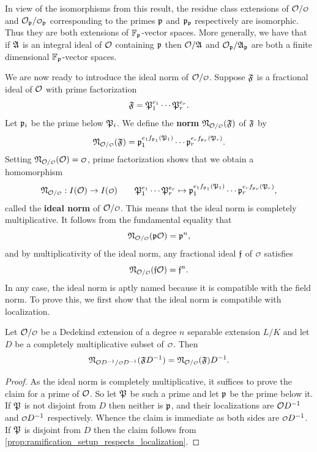     In view of the isomorphisms from this result, the residue class extensions of \(\mc{O}/\smc{O}\) and \(\mc{O}_{\mf{p}}/\smc{O}_{\mf{p}}\) corresponding to the primes \(\mathfrak{p}\) and \(\mathfrak{p}_{\mathfrak{p}}\) respectively are isomorphic. Thus they are both extensions of \(\mathbb{F}_{\mathfrak{p}}\)-vector spaces. More generally, we have that if \(\mathfrak{A}\) is an integral ideal of \(\mathcal{O}\) containing \(\mathfrak{p}\) then \(\mathcal{O}/\mathfrak{A}\) and \(\mathcal{O}_{\mathfrak{p}}/\mathfrak{A}_{\mathfrak{p}}\) are both a finite dimensional \(\mathbb{F}_{\mathfrak{p}}\)-vector spaces. 

    We are now ready to introduce the ideal norm of \(\mc{O}/\smc{O}\). Suppose \(\mathfrak{F}\) is a fractional ideal of \(\mathcal{O}\) with prime factorization
    \[
      \mathfrak{F} = \mathfrak{P}_{1}^{e_{1}} \cdots \mathfrak{P}_{r}^{e_{r}}.
    \]
    Let \(\mathfrak{p}_{i}\) be the prime below \(\mathfrak{P}_{i}\). We define the \textbf{norm} \(\mf{N}_{\mc{O}/\smc{O}}(\mf{F})\) of \(\mathfrak{F}\) by
    \[
      \mf{N}_{\mc{O}/\smc{O}}(\mf{F}) = \mf{p}_{1}^{e_{1}f_{\mf{p}_{1}}(\mf{P}_{1})} \cdots \mf{p}_{r}^{e_{r}f_{\mf{p}_{r}}(\mf{P}_{r})}.
    \]
    Setting \(\mf{N}_{\mc{O}/\smc{O}}(\mc{O}) = \smc{O}\), prime factorization shows that we obtain a homomorphism
    \[
      \mf{N}_{\mc{O}/\smc{O}}:I(\mc{O}) \to I(\smc{O}) \qquad \mf{P}_{1}^{e_{1}} \cdots \mf{P}_{r}^{e_{r}} \mapsto \mf{p}_{1}^{e_{1}f_{\mf{p}_{1}}(\mf{P}_{1})} \cdots \mf{p}_{r}^{e_{r}f_{\mf{p}_{r}}(\mf{P}_{r})},
    \]
    called the \textbf{ideal norm} of \(\mc{O}/\smc{O}\). This means that the ideal norm is completely multiplicative. It follows from the fundamental equality that
    \[
      \mf{N}_{\mc{O}/\smc{O}}(\mf{p}\mc{O}) = \mf{p}^{n},
    \]
    and by multiplicativity of the ideal norm, any fractional ideal \(\mathfrak{f}\) of \(\smc{O}\) satisfies
    \[
      \mf{N}_{\mc{O}/\smc{O}}(\mf{f}\mc{O}) = \mf{f}^{n}.
    \]
    In any case, the ideal norm is aptly named because it is compatible with the field norm. To prove this, we first show that the ideal norm is compatible with localization.

    \begin{proposition}\label{prop:ideal_norm_localization_is_localization_of_ideal_norm}
      Let \(\mc{O}/\smc{O}\) be a Dedekind extension of a degree \(n\) separable extension \(L/K\) and let \(D\) be a completely multiplicative subset of \(\smc{O}\). Then
      \[
        \mf{N}_{\mc{O}D^{-1}/\smc{O}D^{-1}}(\mf{F}D^{-1}) = \mf{N}_{\mc{O}/\smc{O}}(\mf{F})D^{-1}.
      \]
    \end{proposition}
    \begin{proof}
      As the ideal norm is completely multiplicative, it suffices to prove the claim for a prime of \(\mathcal{O}\). So let \(\mathfrak{P}\) be such a prime and let \(\mathfrak{p}\) be the prime below it. If \(\mathfrak{P}\) is not disjoint from \(D\) then neither is \(\mathfrak{p}\), and their localizations are \(\mathcal{O}D^{-1}\) and \(\smc{O}D^{-1}\) respectively. Whence the claim is immediate as both sides are \(\smc{O}D^{-1}\). If \(\mathfrak{P}\) is disjoint from \(D\) then the claim follows from \cref{prop:ramification_setup_respects_localization}.
    \end{proof}


